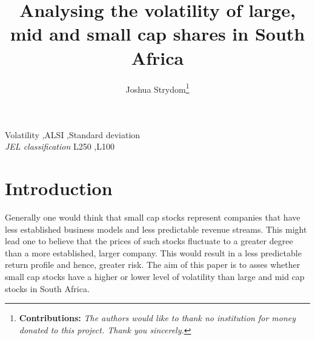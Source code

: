 \documentclass[11pt,preprint, authoryear]{elsarticle}
\numberwithin{equation}{section}
\numberwithin{figure}{section}
\numberwithin{table}{section}
\let\rmarkdownfootnote\footnote%
\def\footnote{\protect\rmarkdownfootnote}
\begin{document}
\begin{frontmatter}  %

\title{Analysing the volatility of large, mid and small cap shares in
South Africa}





\author[Add1]{Joshua Strydom\footnote{\textbf{Contributions:}
  \newline \emph{The authors would like to thank no institution for
  money donated to this project. Thank you sincerely.}}}





\address[Add1]{Stellenbosch University, Stellenbosch, South Africa}



\vspace{1cm}


\begin{keyword}
\footnotesize{
Volatility \sep ALSI \sep Standard deviation \\
\vspace{0.3cm}
}
\footnotesize{
\textit{JEL classification} L250 \sep L100
}
\end{keyword}



\vspace{0.5cm}

\end{frontmatter}



\pagestyle{fancy}
\chead{}
\rhead{}
\lfoot{}
\lhead{}
\cfoot{}


\headsep 35pt %




\hypertarget{introduction}{%
\section{\texorpdfstring{Introduction
\label{Introduction}}{Introduction }}\label{introduction}}

Generally one would think that small cap stocks represent companies that
have less established business models and less predictable revenue
streams. This might lead one to believe that the prices of such stocks
fluctuate to a greater degree than a more established, larger company.
This would result in a less predictable return profile and hence,
greater risk. The aim of this paper is to asses whether small cap stocks
have a higher or lower level of volatility than large and mid cap stocks
in South Africa.
\end{document}
